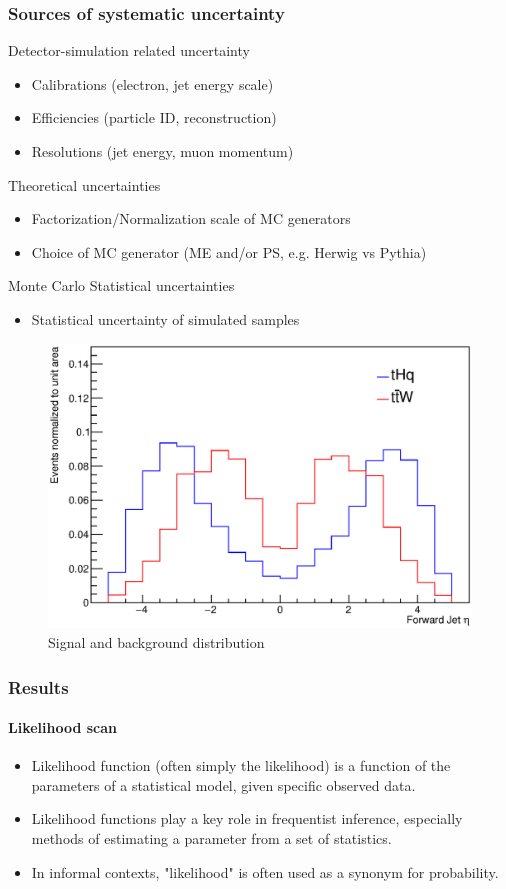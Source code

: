 \documentclass[11pt]{beamer}
\begin{document}
\begin{frame}
\frametitle{Sources of systematic uncertainty}
Detector-simulation related uncertainty
\begin{itemize}
\item Calibrations (electron, jet energy scale)
\item Efficiencies (particle ID, reconstruction)
\item Resolutions (jet energy, muon momentum)
\end{itemize}
Theoretical uncertainties
\begin{itemize}
\item  Factorization/Normalization scale of MC generators
\item Choice of MC generator (ME and/or PS, e.g. Herwig vs Pythia)
\end{itemize}
Monte Carlo Statistical uncertainties
\begin{itemize}\item Statistical uncertainty of simulated samples\cite{2} \end{itemize}
\end{frame}

\begin{frame}
\begin{figure}
	\centering
	\includegraphics[scale=0.5]{figures/compare_variables}
	\caption*{Signal and background distribution}
\end{figure}
\end{frame}

\begin{frame}
\frametitle{Results}
\framesubtitle{Likelihood scan}
\begin{itemize}
	\item Likelihood function (often simply the likelihood) is a function of the
	parameters of a statistical model, given specific observed data.
	\item Likelihood functions play a key role in frequentist inference,
	especially methods of estimating a parameter from a set of
	statistics.
	\item In informal contexts, "likelihood" is often used as a synonym for
	probability.
\end{itemize}
\end{frame}
\end{document}
